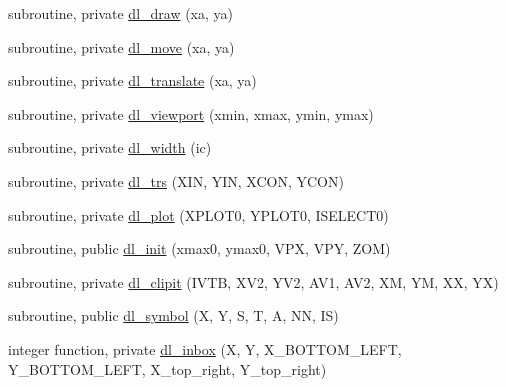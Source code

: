 \begin{DoxyCompactItemize}
subroutine, private \mbox{\hyperlink{namespacem__pixel__slices_acafdf0174290a0e231ca120f6305b5d0}{dl\+\_\+draw}} (xa, ya)
\item 
subroutine, private \mbox{\hyperlink{namespacem__pixel__slices_ab9e9530d7fb4fbea1bc5d52744498731}{dl\+\_\+move}} (xa, ya)
\item 
subroutine, private \mbox{\hyperlink{namespacem__pixel__slices_ad35fa14bd29e8e895f22de6500b6b5ff}{dl\+\_\+translate}} (xa, ya)
\item 
subroutine, private \mbox{\hyperlink{namespacem__pixel__slices_a87a664883c6c5e0e2812df4d1ea29515}{dl\+\_\+viewport}} (xmin, xmax, ymin, ymax)
\item 
subroutine, private \mbox{\hyperlink{namespacem__pixel__slices_a2a4bb6da0ae36c65fdf05996e3ae5487}{dl\+\_\+width}} (ic)
\item 
subroutine, private \mbox{\hyperlink{namespacem__pixel__slices_a141b4da9ce5a0d633cc488f656c0320d}{dl\+\_\+trs}} (X\+IN, Y\+IN, X\+C\+ON, Y\+C\+ON)
\item 
subroutine, private \mbox{\hyperlink{namespacem__pixel__slices_aa70737b5f5945b2f513163ee5c40942d}{dl\+\_\+plot}} (X\+P\+L\+O\+T0, Y\+P\+L\+O\+T0, I\+S\+E\+L\+E\+C\+T0)
\item 
subroutine, public \mbox{\hyperlink{namespacem__pixel__slices_a4ac8bc6e1f869e60a675611420fee0f7}{dl\+\_\+init}} (xmax0, ymax0, V\+PX, V\+PY, Z\+OM)
\item 
subroutine, private \mbox{\hyperlink{namespacem__pixel__slices_af0a3aeaa17e192568cb6a69a3b3eeab6}{dl\+\_\+clipit}} (I\+V\+TB, X\+V2, Y\+V2, A\+V1, A\+V2, XM, YM, XX, YX)
\item 
subroutine, public \mbox{\hyperlink{namespacem__pixel__slices_a2a40fc08575b18772b520c7b5b81a91e}{dl\+\_\+symbol}} (X, Y, S, T, A, NN, IS)
\item 
integer function, private \mbox{\hyperlink{namespacem__pixel__slices_aa0de53a25754eab8fff1732aa2f93eba}{dl\+\_\+inbox}} (X, Y, X\+\_\+\+B\+O\+T\+T\+O\+M\+\_\+\+L\+E\+FT, Y\+\_\+\+B\+O\+T\+T\+O\+M\+\_\+\+L\+E\+FT, X\+\_\+top\+\_\+right, Y\+\_\+top\+\_\+right)
\end{DoxyCompactItemize}
